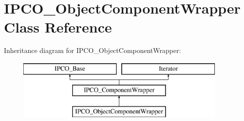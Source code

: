 \hypertarget{class_i_p_c_o___object_component_wrapper}{\section{I\-P\-C\-O\-\_\-\-Object\-Component\-Wrapper Class Reference}
\label{class_i_p_c_o___object_component_wrapper}
}
Inheritance diagram for I\-P\-C\-O\-\_\-\-Object\-Component\-Wrapper\-:\begin{figure}[H]
\begin{center}
\leavevmode
\includegraphics[height=3.000000cm]{class_i_p_c_o___object_component_wrapper}
\end{center}
\end{figure}
